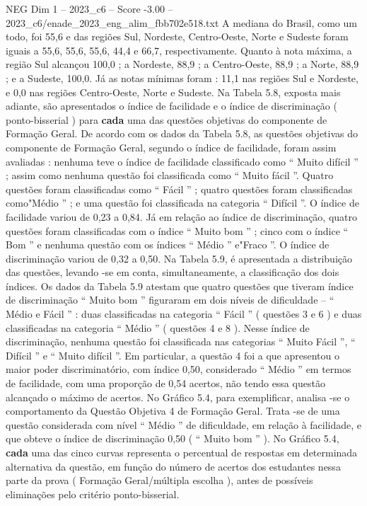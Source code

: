 \begin{textsample}{NEG Dim 1 – 2023\_c6 – Score -3.00 – 2023\_c6/enade\_2023\_eng\_alim\_fbb702e518.txt}
A mediana do Brasil, como um todo, foi 55,6 e das regiões Sul, Nordeste, Centro-Oeste, Norte e Sudeste foram iguais a 55,6, 55,6, 55,6, 44,4 e 66,7, respectivamente.
Quanto à nota máxima, a região Sul alcançou 100,0 ; a Nordeste, 88,9 ; a Centro-Oeste, 88,9 ; a Norte, 88,9 ; e a Sudeste, 100,0.
Já as notas mínimas foram : 11,1 nas regiões Sul e Nordeste, e 0,0 nas regiões Centro-Oeste, Norte e Sudeste.
Na Tabela 5.8, exposta mais adiante, são apresentados o índice de facilidade e o índice de discriminação ( ponto-bisserial ) para \textbf{cada} uma das questões objetivas do componente de Formação Geral.
De acordo com os dados da Tabela 5.8, as questões objetivas do componente de Formação Geral, segundo o índice de facilidade, foram assim avaliadas : nenhuma teve o índice de facilidade classificado como “ Muito difícil ” ; assim como nenhuma questão foi classificada como “ Muito fácil ”.
Quatro questões foram classificadas como “ Fácil ” ; quatro questões foram classificadas como"Médio ” ; e uma questão foi classificada na categoria “ Difícil ”.
O índice de facilidade variou de 0,23 a 0,84.
Já em relação ao índice de discriminação, quatro questões foram classificadas com o índice “ Muito bom ” ; cinco com o índice “ Bom ” e nenhuma questão com os índices “ Médio ” e"Fraco ”.
O índice de discriminação variou de 0,32 a 0,50.
Na Tabela 5.9, é apresentada a distribuição das questões, levando -se em conta, simultaneamente, a classificação dos dois índices.
Os dados da Tabela 5.9 atestam que quatro questões que tiveram índice de discriminação “ Muito bom ” figuraram em dois níveis de dificuldade – “ Médio e Fácil ” : duas classificadas na categoria “ Fácil ” ( questões 3 e 6 ) e duas classificadas na categoria “ Médio ” ( questões 4 e 8 ).
Nesse índice de discriminação, nenhuma questão foi classificada nas categorias “ Muito Fácil ”, “ Difícil ” e “ Muito difícil ”.
Em particular, a questão 4 foi a que apresentou o maior poder discriminatório, com índice 0,50, considerado “ Médio ” em termos de facilidade, com uma proporção de 0,54 acertos, não tendo essa questão alcançado o máximo de acertos.
No Gráfico 5.4, para exemplificar, analisa -se o comportamento da Questão Objetiva 4 de Formação Geral.
Trata -se de uma questão considerada com nível “ Médio ” de dificuldade, em relação à facilidade, e que obteve o índice de discriminação 0,50 ( “ Muito bom ” ).
No Gráfico 5.4, \textbf{cada} uma das cinco curvas representa o percentual de respostas em determinada alternativa da questão, em função do número de acertos dos estudantes nessa parte da prova ( Formação Geral/múltipla escolha ), antes de possíveis eliminações pelo critério ponto-bisserial.

\end{textsample}
